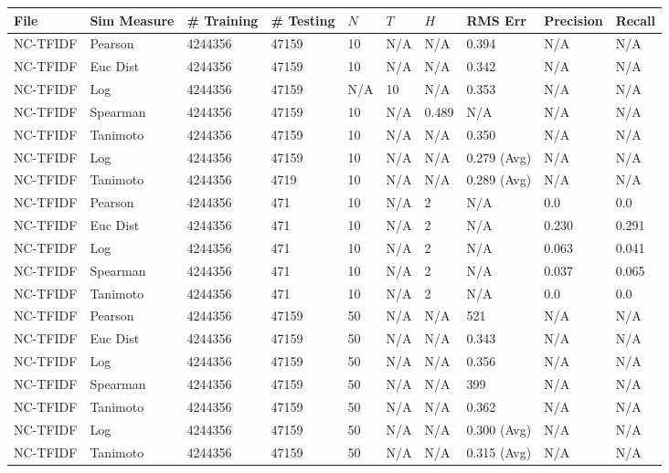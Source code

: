 \documentclass{article}
\begin{document}
\begin{longtable}{ |p{1.7cm}|p{1.9cm}|p{1.5cm}|p{1.5cm}|p{0.75cm}|p{0.75cm}|p{0.75cm}|p{0.75cm}|p{1.5cm}|p{1.5cm}|}
    \hline
    File & Sim Measure & \# Training & \# Testing & $N$ & $T$ & $H$ & RMS Err & Precision & Recall \\ \hline\hline
    NC-TFIDF & Pearson & 4244356 & 47159 & 10 & N/A & N/A & 0.394 & N/A & N/A  \\ \hline
    NC-TFIDF  & Euc Dist & 4244356 & 47159 & 10 & N/A & N/A & 0.342 & N/A & N/A   \\ \hline
    NC-TFIDF  & Log & 4244356 & 47159  & N/A &  10 & N/A& 0.353 & N/A & N/A  \\ \hline
    NC-TFIDF  & Spearman & 4244356 & 47159  & 10 & N/A & 0.489 & N/A & N/A & N/A \\ \hline
    NC-TFIDF  & Tanimoto & 4244356 & 47159 & 10 & N/A& N/A & 0.350 & N/A & N/A \\ \hline
    NC-TFIDF  & Log & 4244356 & 47159 & 10 & N/A& N/A & 0.279 (Avg) & N/A & N/A \\ \hline
    NC-TFIDF  & Tanimoto & 4244356 & 4719 & 10 & N/A & N/A & 0.289 (Avg) & N/A & N/A \\ \hline
    
    NC-TFIDF  & Pearson & 4244356 & 471 & 10 & N/A  & 2 & N/A & 0.0 & 0.0  \\ \hline
    NC-TFIDF  & Euc Dist & 4244356 & 471 & 10 & N/A  & 2 & N/A & 0.230 & 0.291   \\ \hline
    NC-TFIDF  & Log & 4244356 & 471& 10 & N/A & 2 & N/A & 0.063 & 0.041  \\ \hline
    NC-TFIDF  & Spearman & 4244356 & 471 & 10 & N/A  & 2 & N/A &0.037 & 0.065 \\ \hline
    NC-TFIDF  & Tanimoto & 4244356 & 471 & 10 & N/A  & 2 & N/A & 0.0 & 0.0 \\ \hline
    
    NC-TFIDF & Pearson & 4244356 & 47159 & 50 & N/A & N/A & 521 & N/A & N/A  \\ \hline
    NC-TFIDF  & Euc Dist & 4244356 & 47159 & 50 & N/A & N/A & 0.343 & N/A & N/A   \\ \hline
    NC-TFIDF  & Log & 4244356 & 47159 &  50 & N/A & N/A & 0.356 & N/A & N/A  \\ \hline
    NC-TFIDF  & Spearman & 4244356 & 47159 & 50 & N/A & N/A & 399 & N/A & N/A \\ \hline
    NC-TFIDF  & Tanimoto & 4244356 & 47159 & 50 & N/A& N/A & 0.362 & N/A & N/A \\ \hline
    NC-TFIDF  & Log & 4244356 & 47159 & 50 & N/A& N/A & 0.300 (Avg) & N/A & N/A \\ \hline
    NC-TFIDF  & Tanimoto & 4244356 & 47159 & 50 & N/A & N/A & 0.315 (Avg) & N/A & N/A \\ \hline
    

\end{longtable}
\end{document}
